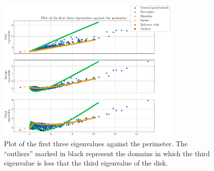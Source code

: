\begin{figure}[!htb]
    \centering
    \begin{minipage}[c]{0.8\textwidth}
        \centering
        \includegraphics[width=0.8\textwidth]{Images/Dirac/quad/first_three_eigenvalues_quad_m_1.png}
        \caption{Plot of the first three eigenvalues against the perimeter. The ``outliers'' marked in black represent the domains in which the third eigenvalue is less that the third eigenvalue of the disk.}
        \label{dirac_first_three_eigenvalues_quad_m_1}
    \end{minipage}

    \vspace{0.5cm}


\end{figure}
